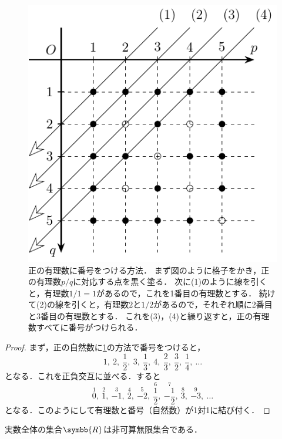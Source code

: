 \documentclass[../sotsu.tex]{subfiles}
\begin{document}
\begin{figure}[tbp]
    \centering
    \includegraphics[width=0.5\linewidth]{rational_countable.pdf}
    \caption{
        正の有理数に番号をつける方法．
        まず図のように格子をかき，正の有理数$p/q$に対応する点を黒く塗る．
        次に(1)のように線を引くと，有理数$1/1 = 1$があるので，これを1番目の有理数とする．
        続けて(2)の線を引くと，有理数$2$と$1/2$があるので，それぞれ順に2番目と3番目の有理数とする．
        これを(3)，(4)と繰り返すと，正の有理数すべてに番号がつけられる．
    }
    \label{fig:positive-rational-count}
\end{figure}


\begin{proof}
    まず，正の自然数に\cref{fig:positive-rational-count}の方法で番号をつけると，
    \[  1, \ 
        2, \ \frac{1}{2}, \ 
        3, \ \frac{1}{3}, \ 
        4, \ \frac{2}{3}, \ \frac{3}{2}, \ \frac{1}{4}, \ 
        \dotsc  \]
    となる．これを正負交互に並べる．すると
    \[  \overset{1}{0}, \ 
        \overset{2}{1}, \ \overset{3}{-1}, \ 
        \overset{4}{2}, \ \overset{5}{-2}, \ \overset{6}{\frac{1}{2}}, \ \overset{7}{-\frac{1}{2}}, \ 
        \overset{8}{3}, \ \overset{9}{-3}, \ \dotsc  \]
    となる．このようにして有理数と番号（自然数）が1対1に結び付く．
\end{proof}



\begin{theorem}
    実数全体の集合$\symbb{R}$は非可算無限集合である\cite[\S 7]{uchida-set-2020}．
\end{theorem}
\end{document}
